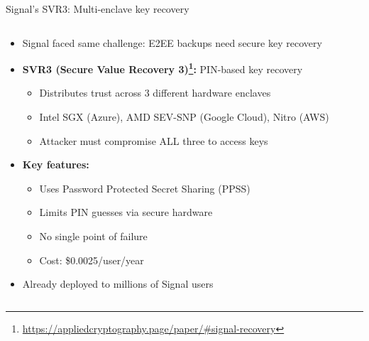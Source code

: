 \documentclass[aspectratio=169, lualatex, handout]{beamer}
\begin{document}
\begin{frame}{Signal's SVR3: Multi-enclave key recovery}
	\begin{columns}[c]
		\begin{column}{1\textwidth}
			\begin{itemize}
				\item Signal faced same challenge: E2EE backups need secure key recovery
				\item \textbf{SVR3 (Secure Value Recovery 3)\footnote{\url{https://appliedcryptography.page/paper/\#signal-recovery}}:} PIN-based key recovery
				      \begin{itemize}
					      \item Distributes trust across 3 different hardware enclaves
					      \item Intel SGX (Azure), AMD SEV-SNP (Google Cloud), Nitro (AWS)
					      \item Attacker must compromise ALL three to access keys
				      \end{itemize}
				\item \textbf{Key features:}
				      \begin{itemize}
					      \item Uses Password Protected Secret Sharing (PPSS)
					      \item Limits PIN guesses via secure hardware
					      \item No single point of failure
					      \item Cost: \$0.0025/user/year
				      \end{itemize}
				\item Already deployed to millions of Signal users
			\end{itemize}
		\end{column}
	\end{columns}
\end{frame}
\end{document}
